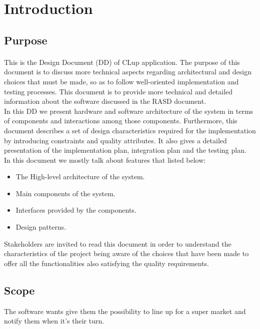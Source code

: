 \section{Introduction}
\subsection{Purpose}
\paragraph{}
This is the Design Document (DD) of CLup application. The purpose of this document is to discuss more technical aspects regarding architectural and design choices that must be made, so as to follow well-oriented implementation and testing processes. This document is to provide more technical and detailed information about the software discussed in the RASD document.\\
In this DD we present hardware and software architecture of the system in terms of components and interactions among those components. Furthermore, this document describes a set of design characteristics required for the implementation by introducing constraints and quality attributes.
It also gives a detailed presentation of the implementation plan, integration plan and the testing plan.\\
In this document we mostly talk about features that listed below:
\begin{itemize}
    \item The High-level architecture of the system.
    \item Main components of the system.
    \item Interfaces provided by the components.
    \item Design patterns.
\end{itemize}

Stakeholders are invited to read this document in order to understand the characteristics of the project being aware of the choices that have been made to offer all the functionalities also satisfying the quality requirements.
\subsection{Scope}

The software wants give them the possibility to line up for a super market and notify them when it's their turn.

